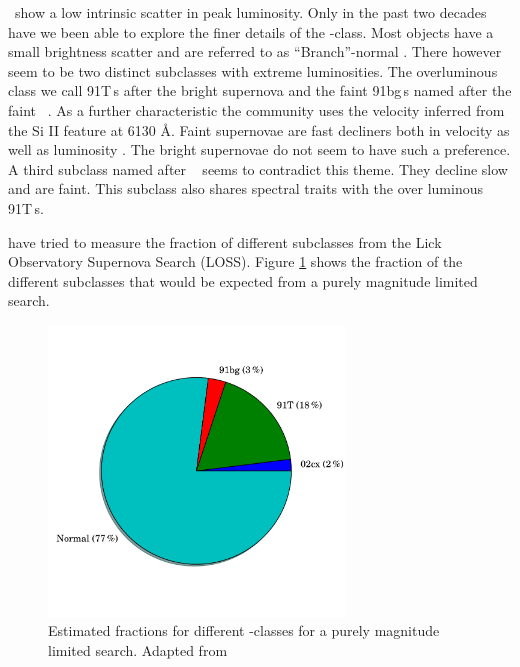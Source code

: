 \sneia\ show a low intrinsic scatter in peak luminosity. Only in the past two decades have we been able to explore the finer details of the \sneia-class.
Most objects have a small brightness scatter and are referred to as ``Branch''-normal \citep{1993AJ....106.2383B}. 
There however seem to be two distinct subclasses with extreme luminosities. The overluminous class we call 91T\,s after the bright supernova  \citet{1992AJ....103.1632P, 1994ApJ...434L..19S} and the faint 91bg\,s named after the faint \ \citep{1992AJ....104.1543F}. As a further characteristic the community uses the velocity inferred from the Si II feature at 6130 \AA.
Faint supernovae are fast decliners both in velocity as well as luminosity \citet{2005ApJ...623.1011B}. The bright supernovae do not seem to have such a preference. 
A third subclass named after \ \citep{2003PASP..115..453L} seems to contradict this theme. They decline slow and are faint. This subclass also shares spectral traits with the over luminous 91T\,s.

\citet{2011MNRAS.412.1441L} have tried to measure the fraction of different subclasses from the Lick Observatory Supernova Search (LOSS). Figure \ref{fig:ia_fracs} shows the fraction of the different subclasses that would be expected from a purely magnitude limited search. 

\begin{figure}[htbp] %
   \centering
   \includegraphics[width=0.7\textwidth, trim=0 2.5cm 0 0cm]{chapter_intro/plots/plot_ia_fracs.pdf} 
   \caption{Estimated fractions for different \snia-classes for a purely magnitude limited search. Adapted from \citet{2011MNRAS.412.1441L}}
   \label{fig:ia_fracs}
\end{figure}

